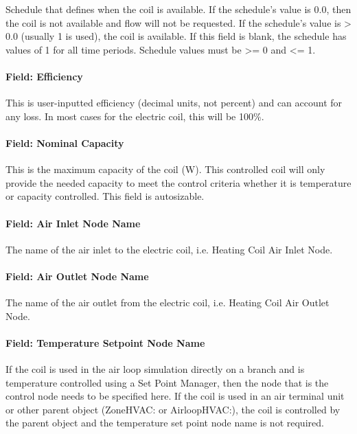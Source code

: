 Schedule that defines when the coil is available. If the schedule's value is 0.0, then the coil is not available and flow will not be requested. If the schedule's value is \textgreater{} 0.0 (usually 1 is used), the coil is available. If this field is blank, the schedule has values of 1 for all time periods. Schedule values must be \textgreater{}= 0 and \textless{}= 1.

\paragraph{Field: Efficiency}\label{field-efficiency}

This is user-inputted efficiency (decimal units, not percent) and can account for any loss. In most cases for the electric coil, this will be 100\%.

\paragraph{Field: Nominal Capacity}\label{field-nominal-capacity-000}

This is the maximum capacity of the coil (W). This controlled coil will only provide the needed capacity to meet the control criteria whether it is temperature or capacity controlled. This field is autosizable.

\paragraph{Field: Air Inlet Node Name}\label{field-air-inlet-node-name-3-001}

The name of the air inlet to the electric coil, i.e. Heating Coil Air Inlet Node.

\paragraph{Field: Air Outlet Node Name}\label{field-air-outlet-node-name-3-001}

The name of the air outlet from the electric coil, i.e. Heating Coil Air Outlet Node.

\paragraph{Field: Temperature Setpoint Node Name}\label{field-temperature-setpoint-node-name-1}

If the coil is used in the air loop simulation directly on a branch and is temperature controlled using a Set Point Manager, then the node that is the control node needs to be specified here. If the coil is used in an air terminal unit or other parent object (ZoneHVAC: or AirloopHVAC:), the coil is controlled by the parent object and the temperature set point node name is not required.

